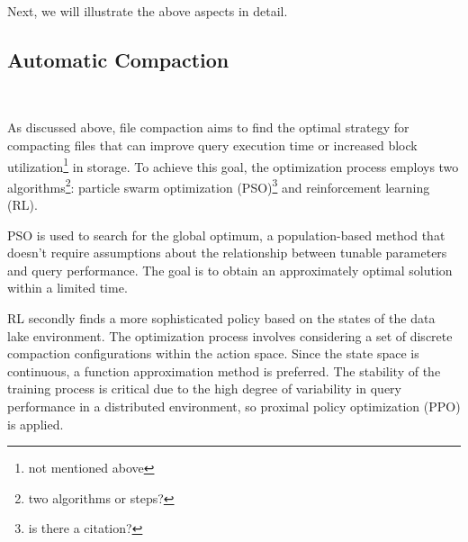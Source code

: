 
Next, we will illustrate the above aspects in detail.


\subsection{Automatic Compaction}~\label{subsec:compaction}

As discussed above, file compaction aims to find the optimal strategy for compacting files that can improve query execution time or increased block utilization\footnote{not mentioned above} in storage. To achieve this goal, the optimization process employs two algorithms\footnote{two algorithms or steps?}: particle swarm optimization (PSO)\footnote{is there a citation? } and reinforcement learning (RL).

PSO is used to search for the global optimum, a population-based method that doesn't require assumptions about the relationship between tunable parameters and query performance. The goal is to obtain an approximately optimal solution within a limited time.  


RL secondly finds a more sophisticated policy based on the states of the data lake environment.
The optimization process involves considering a set of discrete compaction configurations within the action space. Since the state space is continuous, a function approximation method is preferred. The stability of the training process is critical due to the high degree of variability in query performance in a distributed environment, so proximal policy optimization (PPO) is applied.

